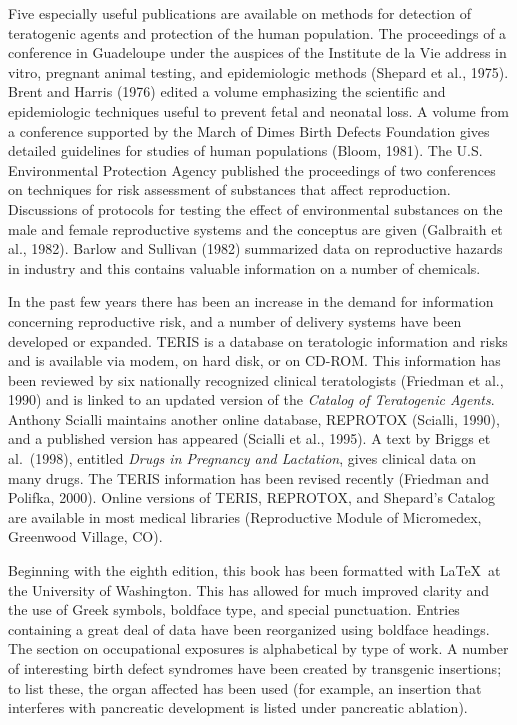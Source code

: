 Five especially useful publications are available on methods for detection of
teratogenic agents and protection of the human population.
The proceedings of a conference in Guadeloupe under the
auspices of the Institute de la Vie address in vitro, pregnant animal
testing, and epidemiologic methods (Shepard et al., 1975).  Brent and
Harris (1976) edited a volume emphasizing the scientific and
epidemiologic techniques useful to prevent fetal and neonatal
loss. A volume from a conference supported by the March of Dimes
Birth Defects Foundation gives detailed guidelines for studies of
human populations (Bloom, 1981). The U.S. Environmental Protection
Agency published the proceedings of two conferences on techniques for
risk assessment of substances that affect reproduction. Discussions
of protocols for testing the effect of environmental substances on
the male and female reproductive systems and the conceptus are given
(Galbraith et al., 1982). Barlow and Sullivan (1982) summarized data
on reproductive hazards in industry and this contains valuable
information on a number of chemicals.

In the past few years there has been an increase in the demand for
information concerning reproductive risk, and a number of delivery
systems have been developed or expanded. TERIS is a database on
teratologic information and risks and is available via modem, on hard
disk, or on CD-ROM. This information has been reviewed by six
nationally recognized clinical teratologists (Friedman et al., 1990)
and is linked to an updated version of the
{\it Catalog of Teratogenic Agents}. Anthony Scialli
maintains another online database, REPROTOX (Scialli, 1990),
and a published version has appeared (Scialli et al., 1995).
A text by Briggs et al.~(1998),
entitled {\it Drugs in Pregnancy and Lactation},
gives clinical data on many drugs.
The TERIS information has been revised recently (Friedman and Polifka, 2000).
Online versions of TERIS, REPROTOX, and Shepard's Catalog are
available in most medical libraries 
(Reproductive Module of Micromedex, 
Greenwood Village, CO).


Beginning with the eighth edition, this book has been formatted with \LaTeX\ 
at the University of Washington. This has allowed for
much improved clarity and the use of Greek symbols,
boldface type, and special
punctuation. Entries containing a great deal of data have been
reorganized using
boldface headings. The section on occupational
exposures is 
alphabetical by type of work.
A number of interesting birth defect syndromes
have been created by transgenic insertions;
to list these, the organ affected has been
used (for example, an insertion that interferes with
pancreatic development is listed
under pancreatic ablation).

